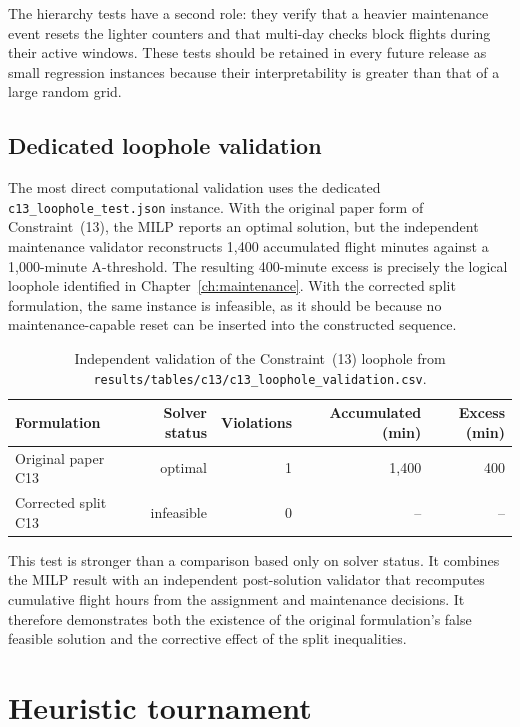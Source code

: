 The hierarchy tests have a second role: they verify that a heavier maintenance
event resets the lighter counters and that multi-day checks block flights during
their active windows. These tests should be retained in every future release as
small regression instances because their interpretability is greater than that
of a large random grid.

\subsection{Dedicated loophole validation}
\label{subsec:computational_c13_loophole}

The most direct computational validation uses the dedicated
\texttt{c13\_loophole\_test.json} instance. With the original paper form of
Constraint~(13), the MILP reports an optimal solution, but the independent
maintenance validator reconstructs 1,400 accumulated flight minutes against a
1,000-minute A-threshold. The resulting 400-minute excess is precisely the
logical loophole identified in Chapter~\ref{ch:maintenance}. With the corrected
split formulation, the same instance is infeasible, as it should be because no
maintenance-capable reset can be inserted into the constructed sequence.

\begin{table}[t]
\centering\small
\caption{Independent validation of the Constraint~(13) loophole from
\texttt{results/tables/c13/c13\_loophole\_validation.csv}.}
\label{tab:c13_loophole}
\begin{tabular}{lrrrr}
\toprule
Formulation & Solver status & Violations & Accumulated (min) & Excess (min) \\
\midrule
Original paper C13 & optimal & 1 & 1,400 & 400 \\
Corrected split C13 & infeasible & 0 & -- & -- \\
\bottomrule
\end{tabular}
\end{table}

This test is stronger than a comparison based only on solver status. It combines
the MILP result with an independent post-solution validator that recomputes
cumulative flight hours from the assignment and maintenance decisions. It
therefore demonstrates both the existence of the original formulation's false
feasible solution and the corrective effect of the split inequalities.

\section{Heuristic tournament}
\label{sec:computational_heuristics}

